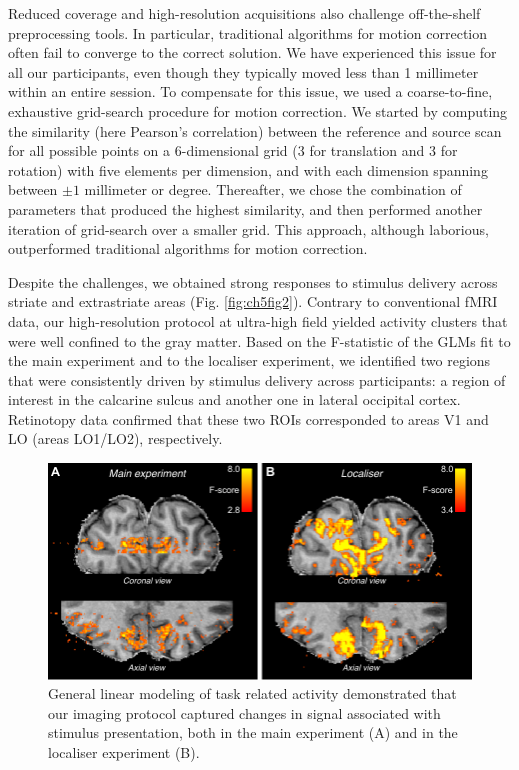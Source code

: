 Reduced coverage and high-resolution acquisitions also challenge off-the-shelf preprocessing tools. In particular, traditional algorithms for motion correction often fail to converge to the correct solution. We have experienced this issue for all our participants, even though they typically moved less than 1 millimeter within an entire session. To compensate for this issue, we used a coarse-to-fine, exhaustive grid-search procedure for motion correction. We started by computing the similarity (here Pearson's correlation) between the reference and source scan for all possible points on a 6-dimensional grid (3 for translation and 3 for rotation) with five elements per dimension, and with each dimension spanning between $\pm 1$ millimeter or degree. Thereafter, we chose the combination of parameters that produced the highest similarity, and then performed another iteration of grid-search over a smaller grid. This approach, although laborious, outperformed traditional algorithms for motion correction.

Despite the challenges, we obtained strong responses to stimulus delivery across striate and extrastriate areas (Fig. \ref{fig:ch5fig2}). Contrary to conventional fMRI data, our high-resolution protocol at ultra-high field yielded activity clusters that were well confined to the gray matter. Based on the F-statistic of the GLMs fit to the main experiment and to the localiser experiment, we identified two regions that were consistently driven by stimulus delivery across participants: a region of interest in the calcarine sulcus and another one in lateral occipital cortex. Retinotopy data confirmed that these two ROIs corresponded to areas V1 and LO (areas LO1/LO2), respectively.

\begin{figure}
  \centering
  \includegraphics[keepaspectratio]{Fig3.pdf}
  \caption[General linear modeling of stimulus related activity.]{General linear modeling of task related activity demonstrated that our imaging protocol captured changes in signal associated with stimulus presentation, both in the main experiment (A) and in the localiser experiment (B).}
  \label{fig:ch5fig3}
\end{figure}

